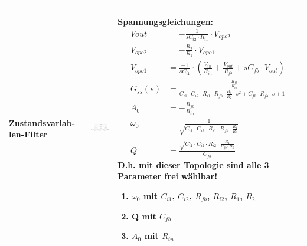 \begin{longtable}{|>{\bfseries}p{3cm}|c|p{10cm}|}
      {Zustandsvariab-len-Filter
      }
      & \includegraphics[width=4cm, valign=t]{./pictures/zustandsvariable.png}
      & {Spannungsgleichungen:\newline
         \begin{align*}
             V{out}		&=-\frac{1}{s C_{i2}\cdot R_{i1}}\cdot V_{opo2}\\
             V_{opo2}	&=-\frac{R_2}{R_1}\cdot V_{opo1}\\
             V_{opo1}	&=\frac{-1}{s C_{i1}}\cdot (\frac{V_{in}}{R_{in}}+\frac{V_{out}}{R_{fb}}+s C_{fb}\cdot V_{out})\\
             G_{ss}(s)	&=\frac{-\frac{R_{fb}}{R_{in}}}{C_{i1}\cdot C_{i2}\cdot R_{i1}\cdot R_{fb}\cdot \frac{R_1}{R_2}\cdot s^2+C_{fb}\cdot R_{fb}\cdot s+1}\\
             A_{0}		&=-\frac{R_{fb}}{R_{in}}\\
             \omega_{0}	&=\frac{1}{\sqrt{C_{i1}\cdot C_{i2}\cdot R_{i1}\cdot R_{fb}\cdot \frac{R_1}{R_2}}}\\
             Q			&=\frac{\sqrt{C_{i1}\cdot C_{i2}\cdot R_{i2}\cdot \frac{R_1}{R_{fb}\cdot R_2}}}{C_{fb}}
         \end{align*}
         D.h. mit dieser Topologie sind alle 3 Parameter frei wählbar!
         \begin{enumerate}
             \item $\omega_{0}$ mit $C_{i1}$, $C_{i2}$, $R_{fb}$, $R_{i2}$, $R_1$, $R_2$
             \item Q mit $C_{fb}$
             \item $A_0$ mit $R_{in}$
         \end{enumerate}
        }
      \\ \hline
\end{longtable}


